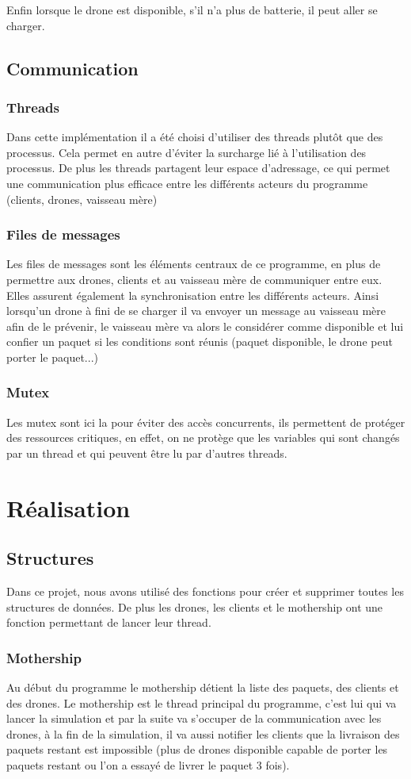 \documentclass[article, backcover, french, nodocumentinfo]{upmethodology-document}
\begin{document}
			Enfin lorsque le drone est disponible, s'il n'a plus de batterie, il peut
			aller se charger.
		\subsection{Communication}
			\subsubsection{Threads}
				Dans cette implémentation il a été choisi d'utiliser des threads plutôt que des processus.
				Cela permet en autre d'éviter la surcharge lié à l'utilisation des processus.
				De plus les threads partagent leur espace d'adressage, ce qui permet une communication
				plus efficace entre les différents acteurs du programme (clients, drones, vaisseau mère)
			\subsubsection{Files de messages}
				Les files de messages sont les éléments centraux de ce programme, en plus de permettre aux drones,
				clients et au vaisseau mère de communiquer entre eux. Elles assurent également la synchronisation entre
				les différents acteurs. Ainsi lorsqu'un drone à fini de se charger il va envoyer un message au vaisseau
				mère afin de le prévenir, le vaisseau mère va alors le considérer comme disponible et lui confier un paquet
				si les conditions sont réunis (paquet disponible, le drone peut porter le paquet...)
			\subsubsection{Mutex}
				Les mutex sont ici la pour éviter des accès concurrents, ils permettent de protéger des ressources critiques,
				en effet, on ne protège que les variables qui sont changés par un thread et qui peuvent être lu par d'autres threads.

	\section{Réalisation}
		\subsection{Structures}
			Dans ce projet, nous avons utilisé des fonctions pour créer et supprimer toutes les structures de données.
			De plus les drones, les clients et le mothership ont une fonction permettant de lancer leur thread.
			\subsubsection{Mothership}
			Au début du programme le mothership détient la liste des paquets, des clients et des drones.
			Le mothership est le thread principal du programme, c'est lui qui va lancer la simulation et par la suite va s'occuper de
			la communication avec les drones, à la fin de la simulation, il va aussi notifier les clients que la livraison des paquets
			restant est impossible (plus de drones disponible capable de porter les paquets restant ou l'on a essayé de livrer le paquet 3 fois).
\end{document}
